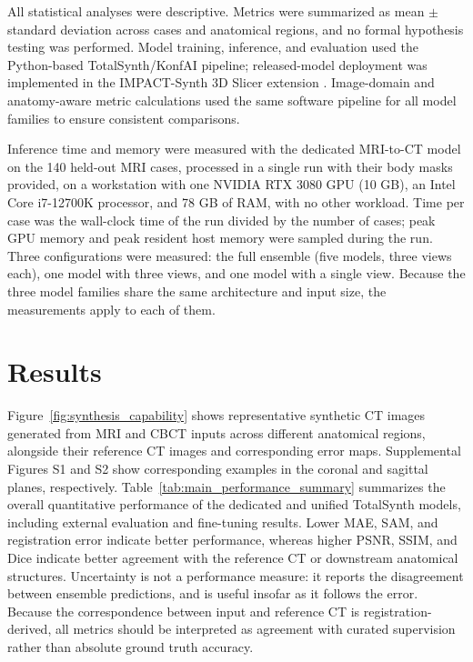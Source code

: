 \documentclass{article}
\begin{document}
All statistical analyses were descriptive. Metrics were summarized as mean $\pm$ standard deviation across cases and anatomical regions, and no formal hypothesis testing was performed. Model training, inference, and evaluation used the Python-based TotalSynth/KonfAI pipeline; released-model deployment was implemented in the IMPACT-Synth 3D Slicer extension \cite{fedorov2012slicer}. Image-domain and anatomy-aware metric calculations used the same software pipeline for all model families to ensure consistent comparisons.

Inference time and memory were measured with the dedicated MRI-to-CT model on the 140 held-out MRI cases, processed in a single run with their body masks provided, on a workstation with one NVIDIA RTX 3080 GPU (10 GB), an Intel Core i7-12700K processor, and 78 GB of RAM, with no other workload. Time per case was the wall-clock time of the run divided by the number of cases; peak GPU memory and peak resident host memory were sampled during the run. Three configurations were measured: the full ensemble (five models, three views each), one model with three views, and one model with a single view. Because the three model families share the same architecture and input size, the measurements apply to each of them.


\section{Results}

Figure~\ref{fig:synthesis_capability} shows representative synthetic CT images generated from MRI and CBCT inputs across different anatomical regions, alongside their reference CT images and corresponding error maps. Supplemental Figures S1 and S2 show corresponding examples in the coronal and sagittal planes, respectively. Table~\ref{tab:main_performance_summary} summarizes the overall quantitative performance of the dedicated and unified TotalSynth models, including external evaluation and fine-tuning results.
Lower MAE, SAM, and registration error indicate better performance, whereas higher PSNR, SSIM, and Dice indicate better agreement with the reference CT or downstream anatomical structures. Uncertainty is not a performance measure: it reports the disagreement between ensemble predictions, and is useful insofar as it follows the error. Because the correspondence between input and reference CT is registration-derived, all metrics should be interpreted as agreement with curated supervision rather than absolute ground truth accuracy.
\end{document}

